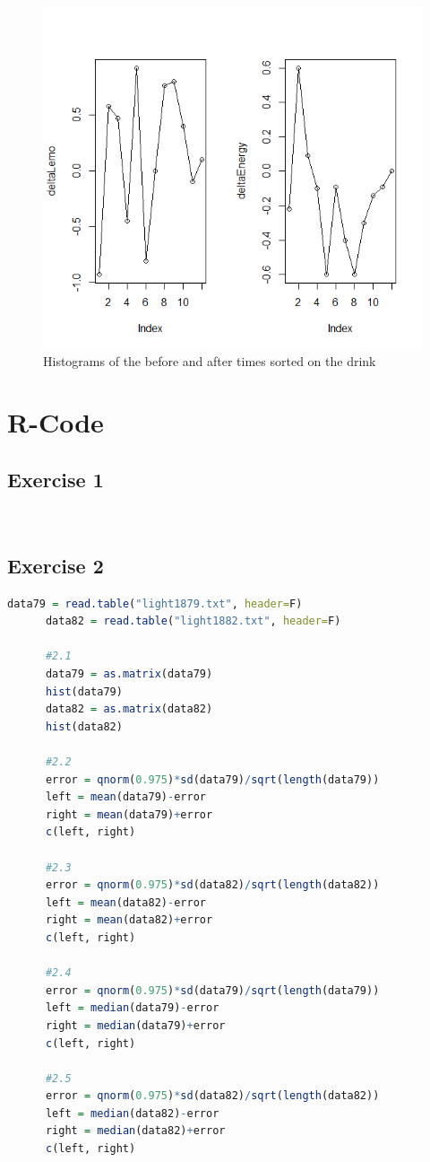 \documentclass{article}
\begin{document}
    \begin{figure}
      \includegraphics[scale=0.3]{../results/LineLemoEnergy.png}
      \caption{Histograms of the before and after times sorted on the drink}
      \label{fig:LineRunDrink}
    \end{figure}


  \section{R-Code}
    \subsection{Exercise 1}\label{sec:RE1}
      \begin{lstlisting}[language=R]
      
      \end{lstlisting}
    \subsection{Exercise 2}\label{sec:RE2}
      \begin{lstlisting}[language=R]
      data79 = read.table("light1879.txt", header=F)
      data82 = read.table("light1882.txt", header=F)

      #2.1
      data79 = as.matrix(data79)
      hist(data79)
      data82 = as.matrix(data82)
      hist(data82)

      #2.2
      error = qnorm(0.975)*sd(data79)/sqrt(length(data79))
      left = mean(data79)-error
      right = mean(data79)+error
      c(left, right)

      #2.3
      error = qnorm(0.975)*sd(data82)/sqrt(length(data82))
      left = mean(data82)-error
      right = mean(data82)+error
      c(left, right)

      #2.4
      error = qnorm(0.975)*sd(data79)/sqrt(length(data79))
      left = median(data79)-error
      right = median(data79)+error
      c(left, right)

      #2.5
      error = qnorm(0.975)*sd(data82)/sqrt(length(data82))
      left = median(data82)-error
      right = median(data82)+error
      c(left, right)
      \end{lstlisting}
\end{document}
